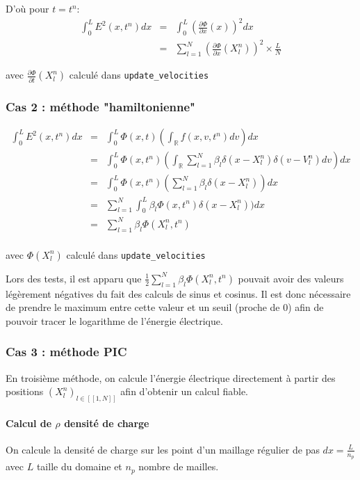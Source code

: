 \documentclass[a4paper,11pt]{article}
\newcommand{\Python}[1]{\texttt{#1}}
\begin{document}
D'où pour $t = t^n$:
$$
\begin{array}{rcl}
\int_{0}^{L} E^2(x,t^n)dx &=& \int_{0}^{L} (\frac{\partial \Phi}{\partial x}(x))^2dx \\
 &=& \sum\limits_{l=1}^{N} (\frac{\partial \Phi}{\partial x}(X_l^n))^2 \times \frac{L}{N}
\end{array}
$$

avec $\frac{\partial \Phi}{\partial t}(X_l^n)$ calculé dans \Python{update_velocities}

\subsubsection{Cas 2 : méthode "hamiltonienne"}
\label{energy hamil}

$$
\begin{array}{rcl}
\int_{0}^{L} E^2(x,t^n)dx &=& \int_{0}^{L} \Phi(x,t)(\int_{\mathbb{R}} f(x,v,t^n) dv) dx\\
 &=& \int_{0}^{L} \Phi(x,t^n)(\int_{\mathbb{R}} \sum\limits_{l=1}^N \beta_l \delta(x-X_l^n) \delta(v -  V_l^n) dv) dx\\
 &=& \int_{0}^{L} \Phi(x,t^n)(\sum\limits_{l=1}^N \beta_l \delta(x -X_l^n)) dx\\
 &=& \sum\limits_{l=1}^N \int_{0}^{L} \beta_l \Phi(x,t^n)	\delta(x -X_l^n)) dx\\
 &=& \sum\limits_{l=1}^N  \beta_l \Phi(X_l^n, t^n) \\
\end{array}
$$

avec $\Phi(X_l^n)$ calculé dans \Python{update_velocities}

Lors des tests, il est apparu que $ \frac{1}{2} \sum\limits_{l=1}^N  \beta_l \Phi(X_l^n, t^n)$ pouvait avoir des valeurs légèrement négatives du fait des calculs de sinus et cosinus. Il est donc nécessaire de prendre le maximum entre cette valeur et un seuil (proche de 0) afin de pouvoir tracer le logarithme de l'énergie électrique.

\subsubsection{Cas 3 : méthode PIC}
\label{energie PIC}

En troisième méthode, on calcule l'énergie électrique directement à partir des positions $(X_l^n)_{l \in [\![1, N]\!]}$ afin d'obtenir un calcul fiable.

\paragraph{Calcul de $\rho$ densité de charge} 
On calcule la densité de charge sur les point d'un maillage régulier de pas $dx = \frac{L}{n_p}$ avec $L$ taille du domaine et $n_p$ nombre de mailles.
\end{document}

